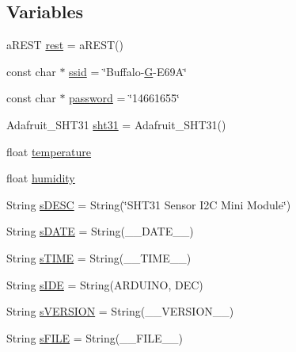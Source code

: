 \subsection*{Variables}
\begin{DoxyCompactItemize}
\item 
a\-R\-E\-S\-T \hyperlink{ESP8266__SHT31__WiFi__REST_8ino_a26fae33ed4ee26417d9384858ac417f7}{rest} = a\-R\-E\-S\-T()
\item 
const char $\ast$ \hyperlink{ESP8266__SHT31__WiFi__REST_8ino_a587ba0cb07f02913598610049a3bbb79}{ssid} = \char`\"{}Buffalo-\/\hyperlink{OWGeneric__SensorStation_8ino_a0b5841fe91d5a3db72753b6217923030}{G}-\/E69\-A\char`\"{}
\item 
const char $\ast$ \hyperlink{ESP8266__SHT31__WiFi__REST_8ino_aa4a2ebcb494493f648ae1e6975672575}{password} = \char`\"{}14661655\char`\"{}
\item 
Adafruit\-\_\-\-S\-H\-T31 \hyperlink{ESP8266__SHT31__WiFi__REST_8ino_a4cc868f67bc519384a9e92cd96d408c9}{sht31} = Adafruit\-\_\-\-S\-H\-T31()
\item 
float \hyperlink{ESP8266__SHT31__WiFi__REST_8ino_afc1d28cfbce795d6ea954ebe725241f5}{temperature}
\item 
float \hyperlink{ESP8266__SHT31__WiFi__REST_8ino_a6a87b2b0cff24d38b367ccd34843a206}{humidity}
\item 
String \hyperlink{ESP8266__SHT31__WiFi__REST_8ino_ae8232eda1714a9bd2e5da8ded2b0c365}{s\-D\-E\-S\-C} = String(\char`\"{}S\-H\-T31 Sensor I2\-C Mini Module\char`\"{})
\item 
String \hyperlink{ESP8266__SHT31__WiFi__REST_8ino_ab0eda3a14fb41a010beea28578b713ee}{s\-D\-A\-T\-E} = String(\-\_\-\-\_\-\-D\-A\-T\-E\-\_\-\-\_\-)
\item 
String \hyperlink{ESP8266__SHT31__WiFi__REST_8ino_aae95a988bed97dcf06125d816b0378e6}{s\-T\-I\-M\-E} = String(\-\_\-\-\_\-\-T\-I\-M\-E\-\_\-\-\_\-)
\item 
String \hyperlink{ESP8266__SHT31__WiFi__REST_8ino_a237040e243e5e70e2ff9ff6c16c4364f}{s\-I\-D\-E} = String(A\-R\-D\-U\-I\-N\-O, D\-E\-C)
\item 
String \hyperlink{ESP8266__SHT31__WiFi__REST_8ino_a4dc4702d8b6169db32029731da0ba8a0}{s\-V\-E\-R\-S\-I\-O\-N} = String(\-\_\-\-\_\-\-V\-E\-R\-S\-I\-O\-N\-\_\-\-\_\-)
\item 
String \hyperlink{ESP8266__SHT31__WiFi__REST_8ino_a904bb91a335ed78bb595b14dfed03182}{s\-F\-I\-L\-E} = String(\-\_\-\-\_\-\-F\-I\-L\-E\-\_\-\-\_\-)
\end{DoxyCompactItemize}


